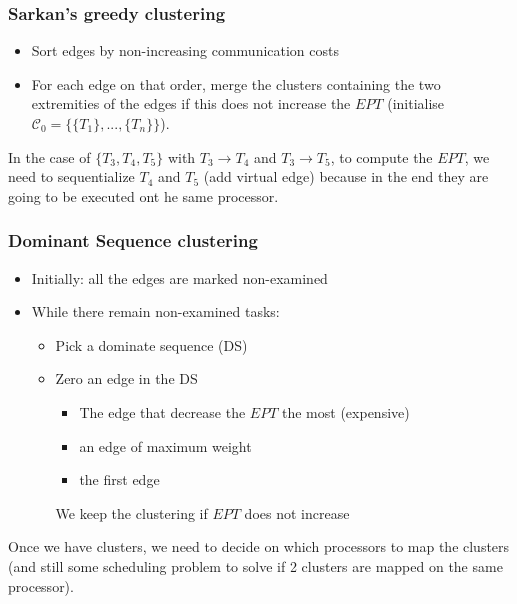 \documentclass{article}
\begin{document}
\subsubsection*{Sarkan's greedy clustering}
\begin{itemize}
\item Sort edges by non-increasing communication costs
\item For each edge on that order, merge the clusters containing the two extremities of the edges if this does not increase the $EPT$ (initialise $\mathcal{C}_0=\{\{T_1\},...,\{T_n\}\}$).
\end{itemize}


In the case of $\{T_3,T_4,T_5\}$ with $T_3 \to T_4$ and $T_3 \to T_5$, to compute the $EPT$, we need to sequentialize $T_4$ and $T_5$ (add virtual edge) because in the end they are going to be executed ont he same processor.

\subsubsection*{Dominant Sequence clustering} 
\begin{itemize}
\item Initially: all the edges are marked non-examined
\item While there remain non-examined tasks:
\begin{itemize}
\item Pick a dominate sequence (DS)
\item Zero an edge in the DS
\begin{itemize}
\item The edge that decrease the $EPT$ the most (expensive)
\item an edge of maximum weight
\item the first edge
\end{itemize}
We keep the clustering if $EPT$ does not increase
\end{itemize}
\end{itemize}

Once we have clusters, we need to decide on which processors to map the clusters (and still some scheduling problem to solve if 2 clusters are mapped on the same processor).
\end{document}
